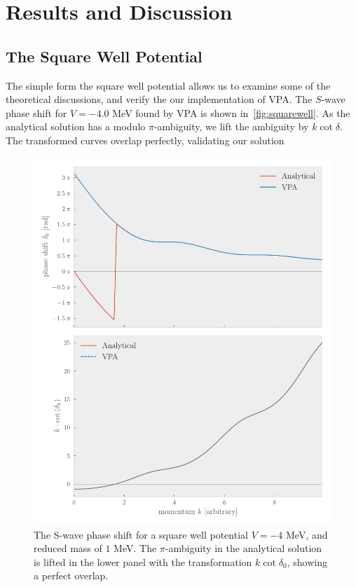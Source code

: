 \section{Results and Discussion}\label{sec:Results}

\subsection{The Square Well Potential}

The simple form the square well potential allows us to examine some of the
theoretical discussions, and verify the our implementation of VPA. The
\(S\)-wave phase shift for \(V=-4.0\) MeV found by VPA is shown
in~\cref{fig:squarewell}. As the analytical solution has a modulo
\(\pi\)-ambiguity, we lift the ambiguity by \(k\cot\delta\). The transformed
curves overlap perfectly, validating our solution

\begin{figure}[ht]
  \showthe\columnwidth %
  \showthe\textwidth %
  \centering
  \includegraphics[]{Figures/analytical_cot.pdf}
  \caption{\label{fig:analyticalcot} The S-wave phase shift for a square well
    potential \(V=-4\) MeV, and reduced mass of \(1\) MeV. The \(\pi\)-ambiguity
  in the analytical solution is lifted in the lower panel with the
  transformation \(k\cot{\delta_{0}}\), showing a perfect overlap.}
\end{figure}

